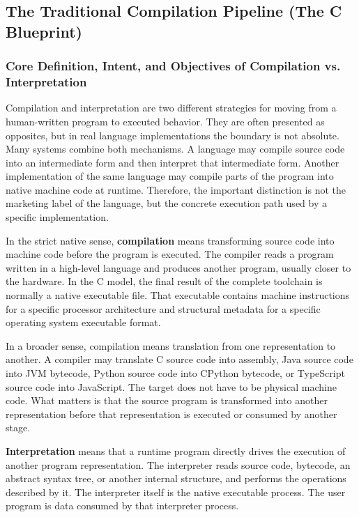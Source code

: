 \subsection{The Traditional Compilation Pipeline (The C Blueprint)}
\subsubsection{Core Definition, Intent, and Objectives of Compilation vs. Interpretation}

Compilation and interpretation are two different strategies for moving from a human-written program to executed behavior. They are often presented as opposites, but in real language implementations the boundary is not absolute. Many systems combine both mechanisms. A language may compile source code into an intermediate form and then interpret that intermediate form. Another implementation of the same language may compile parts of the program into native machine code at runtime. Therefore, the important distinction is not the marketing label of the language, but the concrete execution path used by a specific implementation.

In the strict native sense, \textbf{compilation} means transforming source code into machine code before the program is executed. The compiler reads a program written in a high-level language and produces another program, usually closer to the hardware. In the C model, the final result of the complete toolchain is normally a native executable file. That executable contains machine instructions for a specific processor architecture and structural metadata for a specific operating system executable format.

In a broader sense, compilation means translation from one representation to another. A compiler may translate C source code into assembly, Java source code into JVM bytecode, Python source code into CPython bytecode, or TypeScript source code into JavaScript. The target does not have to be physical machine code. What matters is that the source program is transformed into another representation before that representation is executed or consumed by another stage.

\textbf{Interpretation} means that a runtime program directly drives the execution of another program representation. The interpreter reads source code, bytecode, an abstract syntax tree, or another internal structure, and performs the operations described by it. The interpreter itself is the native executable process. The user program is data consumed by that interpreter process.

